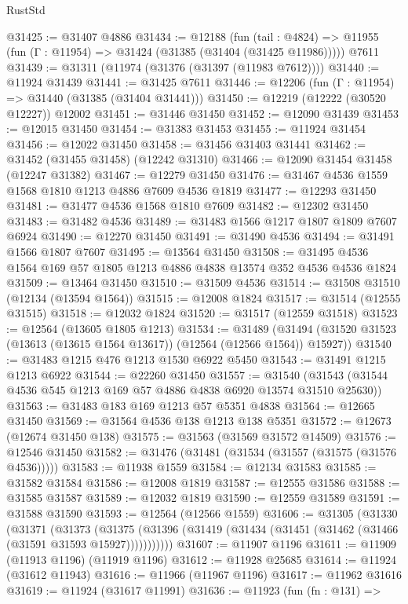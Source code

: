 \begin{lexlean}{RustStd}
\begin{coremodule}
@31425 := @31407 @4886
@31434 := @12188
    (fun (tail : @4824) => @11955 (fun (Γ : @11954) => @31424 (@31385 (@31404 (@31425 @11986)))))
    @7611
@31439 := @31311 (@11974 (@31376 (@31397 (@11983 @7612))))
@31440 := @11924 @31439
@31441 := @31425 @7611
@31446 := @12206 (fun (Γ : @11954) => @31440 (@31385 (@31404 @31441)))
@31450 := @12219 (@12222 (@30520 @12227)) @12002
@31451 := @31446 @31450
@31452 := @12090 @31439
@31453 := @12015 @31450
@31454 := @31383 @31453
@31455 := @11924 @31454
@31456 := @12022 @31450
@31458 := @31456 @31403 @31441
@31462 := @31452 (@31455 @31458) (@12242 @31310)
@31466 := @12090 @31454 @31458 (@12247 @31382)
@31467 := @12279 @31450
@31476 := @31467 @4536 @1559 @1568 @1810 @1213 @4886 @7609 @4536 @1819
@31477 := @12293 @31450
@31481 := @31477 @4536 @1568 @1810 @7609
@31482 := @12302 @31450
@31483 := @31482 @4536
@31489 := @31483 @1566 @1217 @1807 @1809 @7607 @6924
@31490 := @12270 @31450
@31491 := @31490 @4536
@31494 := @31491 @1566 @1807 @7607
@31495 := @13564 @31450
@31508 := @31495 @4536 @1564 @169 @57 @1805 @1213 @4886 @4838 @13574 @352 @4536 @4536 @1824
@31509 := @13464 @31450
@31510 := @31509 @4536
@31514 := @31508 @31510 (@12134 (@13594 @1564))
@31515 := @12008 @1824
@31517 := @31514 (@12555 @31515)
@31518 := @12032 @1824
@31520 := @31517 (@12559 @31518)
@31523 := @12564 (@13605 @1805 @1213)
@31534 := @31489
    (@31494 (@31520 @31523 (@13613 (@13615 @1564 @13617)) (@12564 (@12566 @1564)) @15927))
@31540 := @31483 @1215 @476 @1213 @1530 @6922 @5450
@31543 := @31491 @1215 @1213 @6922
@31544 := @22260 @31450
@31557 := @31540 (@31543 (@31544 @4536 @545 @1213 @169 @57 @4886 @4838 @6920 @13574 @31510 @25630))
@31563 := @31483 @183 @169 @1213 @57 @5351 @4838
@31564 := @12665 @31450
@31569 := @31564 @4536 @138 @1213 @138 @5351
@31572 := @12673 (@12674 @31450 @138)
@31575 := @31563 (@31569 @31572 @14509)
@31576 := @12546 @31450
@31582 := @31476 (@31481 (@31534 (@31557 (@31575 (@31576 @4536)))))
@31583 := @11938 @1559
@31584 := @12134 @31583
@31585 := @31582 @31584
@31586 := @12008 @1819
@31587 := @12555 @31586
@31588 := @31585 @31587
@31589 := @12032 @1819
@31590 := @12559 @31589
@31591 := @31588 @31590
@31593 := @12564 (@12566 @1559)
@31606 := @31305
    (@31330
      (@31371
        (@31373
          (@31375 (@31396 (@31419 (@31434 (@31451 (@31462 (@31466 (@31591 @31593 @15927)))))))))))
@31607 := @11907 @1196
@31611 := @11909 (@11913 @1196) (@11919 @1196)
@31612 := @11928 @25685
@31614 := @11924 (@31612 @11943)
@31616 := @11966 (@11967 @1196)
@31617 := @11962 @31616
@31619 := @11924 (@31617 @11991)
@31636 := @11923
    (fun (fn : @131) =>

\end{coremodule}
\end{lexlean}
